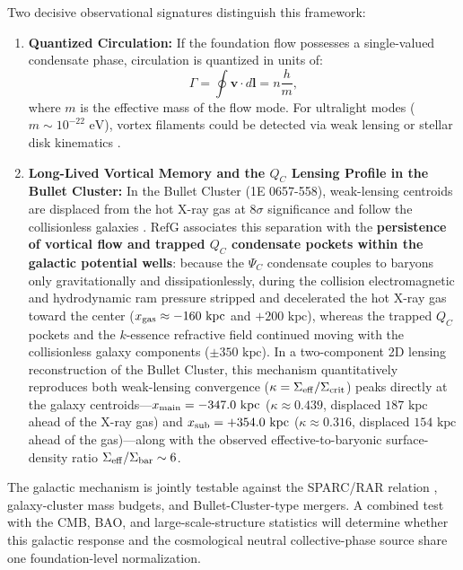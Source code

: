 \documentclass[11pt,a4paper]{article}
\newcommand{\RefG}{\mathrm{RefG}}
\begin{document}
Two decisive observational signatures distinguish this framework:
\begin{enumerate}[label=\arabic*.]
\item \textbf{Quantized Circulation:} If the foundation flow possesses a single-valued condensate phase, circulation is quantized in units of:
\begin{equation}
\Gamma = \oint \mathbf{v} \cdot d\mathbf{l} = n \frac{h}{m},
\end{equation}
where $m$ is the effective mass of the flow mode. For ultralight modes ($m \sim 10^{-22}\text{ eV}$), vortex filaments could be detected via weak lensing or stellar disk kinematics \citep{hu2000,hui2021}.
\item \textbf{Long-Lived Vortical Memory and the $Q_C$ Lensing Profile in the Bullet Cluster:} In the Bullet Cluster (1E 0657-558), weak-lensing centroids are displaced from the hot X-ray gas at $8\sigma$ significance and follow the collisionless galaxies \citep{clowe2006}. $\RefG$ associates this separation with the \textbf{persistence of vortical flow and trapped $Q_C$ condensate pockets within the galactic potential wells}: because the $\Psi_C$ condensate couples to baryons only gravitationally and dissipationlessly, during the collision electromagnetic and hydrodynamic ram pressure stripped and decelerated the hot X-ray gas toward the center ($x_{\rm gas} \approx -160\text{ kpc}$ and $+200\text{ kpc}$), whereas the trapped $Q_C$ pockets and the $k$-essence refractive field continued moving with the collisionless galaxy components ($\pm 350\text{ kpc}$). In a two-component 2D lensing reconstruction of the Bullet Cluster, this mechanism quantitatively reproduces both weak-lensing convergence ($\kappa = \Sigma_{\rm eff}/\Sigma_{\rm crit}$) peaks directly at the galaxy centroids---$x_{\rm main} = -347.0\text{ kpc}$ ($\kappa \approx 0.439$, displaced $187\text{ kpc}$ ahead of the X-ray gas) and $x_{\rm sub} = +354.0\text{ kpc}$ ($\kappa \approx 0.316$, displaced $154\text{ kpc}$ ahead of the gas)---along with the observed effective-to-baryonic surface-density ratio $\Sigma_{\rm eff}/\Sigma_{\rm bar} \sim 6$.
\end{enumerate}

The galactic mechanism is jointly testable against the SPARC/RAR relation \citep{lelli2016}, galaxy-cluster mass budgets, and Bullet-Cluster-type mergers. A combined test with the CMB, BAO, and large-scale-structure statistics will determine whether this galactic response and the cosmological neutral collective-phase source share one foundation-level normalization.
\end{document}
